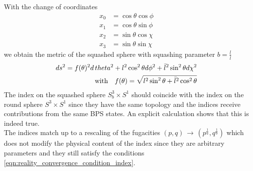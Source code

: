 With the change of coordinates 
\begin{align}
x_0  & =  \cos \theta \cos \phi \\
x_1  & = \cos \theta \sin \phi \\
x_2  & = \sin \theta \cos \chi \\
x_3  & = \sin \theta \sin \chi 
\end{align}
we obtain the metric of the squashed sphere with squashing parameter 
$b = \frac{l}{\bar{l}}$
\begin{align}
 d s^2 = f(\theta)^2 d \,theta^2 + l^2 \cos^2 \theta d \phi ^2 + \bar{l}^2 \sin^2 \theta d \chi^2 \\
\hbox{with} \quad f( \theta) = \sqrt{ l^2 \sin^2 \theta + \bar{l}^2 \cos^2 \theta}
\end{align}
The index on the squashed sphere $S_b^3 \times S^1$ should coincide with the index on the round sphere $S^3 \times S^1$ since they have the same topology and the indices receive contributions from the same BPS states.
An explicit calculation \cite{Agarwal:2012hs} shows that this is indeed true. \\
The indices match up to a rescaling of the fugacities $(p,q) \, \rightarrow \, (p^{\frac{1}{a}}, q^{\frac{1}{b}})$ which does not modify the physical content of the index since they are arbitrary parameters and they still satisfy the conditions \eqref{eqn:reality_convergence_condition_index}.

